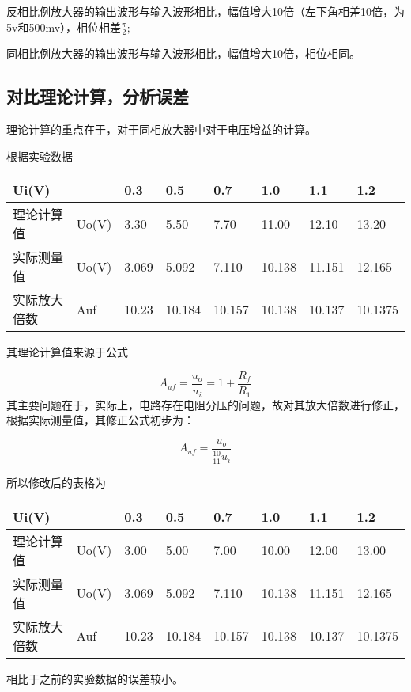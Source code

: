 \documentclass[dvipsnames, svgnames,a4paper,11pt]{article}
\begin{document}
	反相比例放大器的输出波形与输入波形相比，幅值增大10倍（左下角相差10倍，为5v和500mv），相位相差$\frac{\pi}{2};$

	同相比例放大器的输出波形与输入波形相比，幅值增大10倍，相位相同。
	\subsection{对比理论计算，分析误差}
	理论计算的重点在于，对于同相放大器中对于电压增益的计算。

	根据实验数据

	\begin{table}[!ht]
		\centering
		\begin{tabular}{|l|l|l|l|l|l|l|l|}
		\hline
		Ui(V) & & 0.3 & 0.5 & 0.7 & 1.0 & 1.1 & 1.2 \\ \hline
		理论计算值 & Uo(V) & 3.30 & 5.50 & 7.70 & 11.00 & 12.10 & 13.20 \\ \hline
		实际测量值 & Uo(V) & 3.069 & 5.092 & 7.110 & 10.138 & 11.151 & 12.165 \\ \hline
		实际放大倍数 & Auf & 10.23 & 10.184 & 10.157 & 10.138 & 10.137 & 10.1375 \\ \hline
		\end{tabular}
	\end{table}

	其理论计算值来源于公式
        
      $$A_{uf} = \frac{u_{o}}{u_{i}} = 1 + \frac{R_{f}}{R_{1}}$$
    其主要问题在于，实际上，电路存在电阻分压的问题，故对其放大倍数进行修正，根据实际测量值，其修正公式初步为：

	$$A_{uf}=\frac{u_o}{\frac{10}{11}u_i}$$

	所以修改后的表格为
	
	\begin{table}[!ht]
		\centering
		\begin{tabular}{|l|l|l|l|l|l|l|l|}
		\hline
		Ui(V) & & 0.3 & 0.5 & 0.7 & 1.0 & 1.1 & 1.2 \\ \hline
		理论计算值 & Uo(V) & 3.00 & 5.00 & 7.00 & 10.00 & 12.00 & 13.00 \\ \hline
		实际测量值 & Uo(V) & 3.069 & 5.092 & 7.110 & 10.138 & 11.151 & 12.165 \\ \hline
		实际放大倍数 & Auf & 10.23 & 10.184 & 10.157 & 10.138 & 10.137 & 10.1375 \\ \hline
		\end{tabular}
	\end{table}

	相比于之前的实验数据的误差较小。
\end{document}
